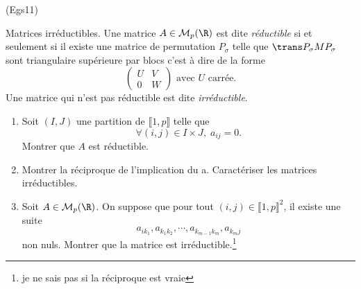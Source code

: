 \begin{tiny}(Egs11)\end{tiny} Matrices irréductibles.\newline
Une matrice $A \in \mathcal{M}_p(\R)$ est dite \emph{réductible} si et seulement si il existe une matrice de permutation $P_{\sigma}$ telle que 
$\trans P_{\sigma} M P_{\sigma}$ sont triangulaire supérieure par blocs c'est à dire de la forme
\[
 \begin{pmatrix}
  U & V \\ 0 & W
 \end{pmatrix}
\text{ avec } U \text{ carrée}.
\]
Une matrice qui n'est pas réductible est dite \emph{irréductible}.
\begin{enumerate}
 \item Soit $(I,J)$ une partition de $\llbracket 1,p \rrbracket$ telle que
\[
 \forall (i,j) \in I\times J, \; a_{i j} = 0.
\]
Montrer que $A$ est réductible.
 \item Montrer la réciproque de l'implication du a. Caractériser les matrices irréductibles.
 \item Soit $A \in \mathcal{M}_p(\R)$. On suppose que pour tout $(i,j) \in \llbracket 1,p \rrbracket^2$, il existe une suite
\[
 a_{i k_1}, a_{k_1 k_2}, \cdots, a_{k_{m-1} k_m}, a_{k_m j}
\]
non nuls. Montrer que la matrice est irréductible.\footnote{je ne sais pas si la réciproque est vraie}
\end{enumerate}
